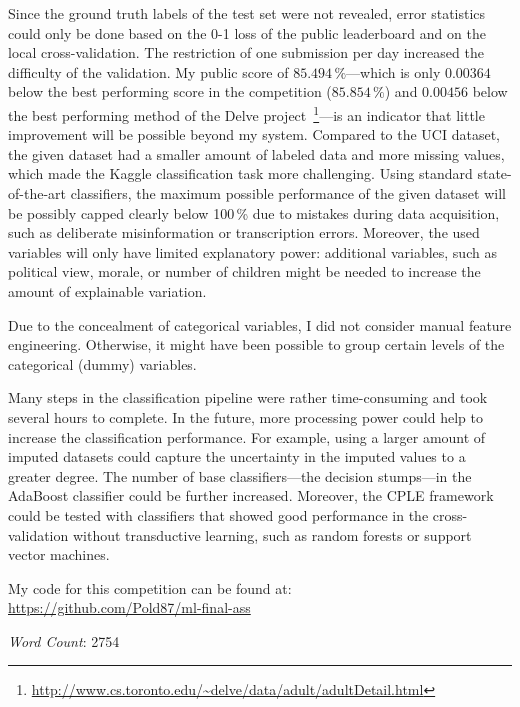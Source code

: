\documentclass[a4paper]{article}
\begin{document}
Since the ground truth labels of the test set were not revealed, error
statistics could only be done based on the 0-1 loss of the public
leaderboard and on the local cross-validation. The restriction of one
submission per day increased the difficulty of the validation. My
public score of $85.494\,\%$---which is only $0.00364$ below the best
performing score in the competition ($85.854\,\%$) and $0.00456$ below
the best performing method of the Delve
project~\footnote{\url{http://www.cs.toronto.edu/~delve/data/adult/adultDetail.html}}---is
an indicator that little improvement will be possible beyond my
system. Compared to the UCI dataset, the given dataset had a smaller
amount of labeled data and more missing values, which made the Kaggle
classification task more challenging. Using standard state-of-the-art
classifiers, the maximum possible performance of the given dataset
will be possibly capped clearly below 100\,\% due to mistakes during
data acquisition, such as deliberate misinformation or transcription
errors. Moreover, the used variables will only have limited
explanatory power: additional variables, such as political view,
morale, or number of children might be needed to increase the amount
of explainable variation.

Due to the concealment of categorical variables, I did not consider
manual feature engineering. Otherwise, it might have been possible to
group certain levels of the categorical (dummy) variables.

Many steps in the classification pipeline were rather time-consuming
and took several hours to complete. In the future, more processing
power could help to increase the classification performance. For
example, using a larger amount of imputed datasets could capture the
uncertainty in the imputed values to a greater degree. The number of
base classifiers---the decision stumps---in the AdaBoost classifier
could be further increased. Moreover, the CPLE framework could be
tested with classifiers that showed good performance in the
cross-validation without transductive learning, such as random forests
or support vector machines.

My code for this competition can be found at:\\
\url{https://github.com/Pold87/ml-final-ass}

\noindent \emph{Word Count}: 2754

\printbibliography
\end{document}
